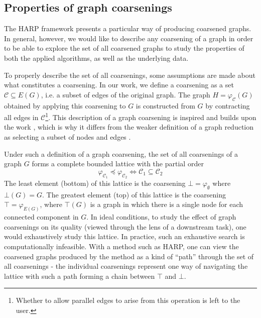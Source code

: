 \subsection{Properties of graph coarsenings}\label{sec:coarsening-properties}

The HARP framework presents a particular way of producing coarsened graphs. In general, however, we would like to describe any coarsening of a graph in order to be able to explore the set of all coarsened graphs to study the properties of both the applied algorithms, as well as the underlying data.

To properly describe the set of all coarsenings, some assumptions are made about what constitutes a coarsening. In our work, we define a coarsening as a set \( \mathcal{C} \subseteq E \left( G \right) \), i.e. a subset of edges of the original graph. The graph \( H = \varphi_\mathcal{C} \left( G \right) \) obtained by applying this coarsening to \( G \) is constructed from \( G \) by contracting all edges in \( \mathcal{C} \)\footnote{Whether to allow parallel edges to arise from this operation is left to the user.}. This description of a graph coarsening is inspired and builds upon the work \cite{schulz_mining_2019}, which is why it differs from the weaker definition of a graph reduction as selecting a subset of nodes and edges \cite{huang_scaling_2021, loukas_graph_2019}.

Under such a definition of a graph coarsening, the set of all coarsenings of a graph \( G \) forms a complete bounded lattice with the partial order
\[ \varphi_{\mathcal{C}_1} \preceq \varphi_{\mathcal{C}_2} \iff \mathcal{C}_1 \subseteq \mathcal{C}_2 \]
The least element (bottom) of this lattice is the coarsening \( \bot = \varphi_\emptyset \) where \( \bot \left( G \right) = G \). The greatest element (top) of this lattice is the coarsening \( \top = \varphi_{E \left( G \right)} \), where \( \top \left( G \right) \) is a graph in which there is a single node for each connected component in \( G \). In ideal conditions, to study the effect of graph coarsenings on its quality (viewed through the lens of a downstream task), one would exhaustively study this lattice. In practice, such an exhaustive search is computationally infeasible. With a method such as HARP, one can view the coarsened graphs produced by the method as a kind of \enquote{path} through the set of all coarsenings - the individual coarsenings represent one way of navigating the lattice with such a path forming a chain between \( \top \) and \( \bot \).
